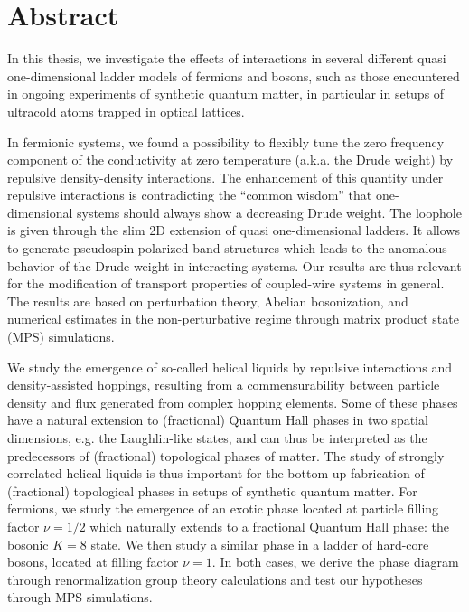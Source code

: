 %
\chapter*{Abstract}
%
In this thesis, we investigate the effects of interactions in several different quasi one-dimensional ladder models of fermions and bosons, such as those encountered in ongoing experiments of synthetic quantum matter, in particular in setups of ultracold atoms trapped in optical lattices.

In fermionic systems, we found a possibility to flexibly tune the zero frequency component of the conductivity at zero temperature (a.k.a. the Drude weight) by repulsive density-density interactions.
The enhancement of this quantity under repulsive interactions is contradicting the ``common wisdom'' that one-dimensional systems should always show a decreasing Drude weight.
The loophole is given through the slim 2D extension of quasi one-dimensional ladders.
It allows to generate pseudospin polarized band structures which leads to the anomalous behavior of the Drude weight in interacting systems.
Our results are thus relevant for the modification of transport properties of coupled-wire systems in general.
The results are based on perturbation theory, Abelian bosonization, and numerical estimates in the non-perturbative regime through matrix product state (MPS) simulations.

We study the emergence of so-called helical liquids by repulsive interactions and density-assisted hoppings, resulting from a commensurability between particle density and flux generated from complex hopping elements.
Some of these phases have a natural extension to (fractional) Quantum Hall phases in two spatial dimensions, e.g. the Laughlin-like states, and can thus be interpreted as the predecessors of (fractional) topological phases of matter.
The study of strongly correlated helical liquids is thus important for the bottom-up fabrication of (fractional) topological phases in setups of synthetic quantum matter.
For fermions, we study the emergence of an exotic phase located at particle filling factor $\nu=1/2$ which naturally extends to a fractional Quantum Hall phase: the bosonic $K=8$ state.
We then study a similar phase in a ladder of hard-core bosons, located at filling factor $\nu=1$.
In both cases, we derive the phase diagram through renormalization group theory calculations and test our hypotheses through MPS simulations.

